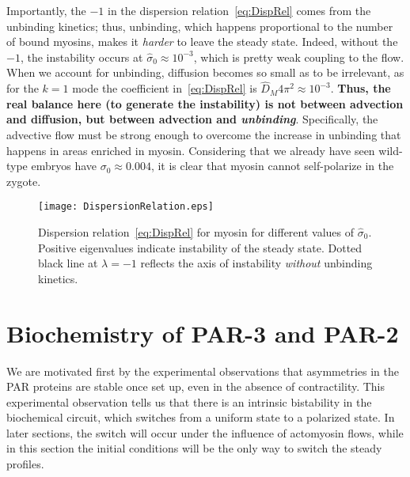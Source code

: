 \documentclass[11pt]{article}
\newcommand{\6}[1]{#1_{\text{6}}}
\newcommand{\3}[1]{#1_{\text{3}}}
\begin{document}
Importantly, the $-1$ in the dispersion relation\ \eqref{eq:DispRel} comes from the unbinding kinetics; thus, unbinding, which happens proportional to the number of bound myosins, makes it \emph{harder} to leave the steady state. Indeed, without the $-1$, the instability occurs at $\hat{\sigma}_0 \approx 10^{-3}$, which is pretty weak coupling to the flow. When we account for unbinding, diffusion becomes so small as to be irrelevant, as for the $k=1$ mode the coefficient in\ \eqref{eq:DispRel} is $\hat{D}_M 4 \pi^2 \approx 10^{-3}$. \textbf{Thus, the real balance here (to generate the instability) is not between advection and diffusion, but between advection and \emph{unbinding}}. Specifically, the advective flow must be strong enough to overcome the increase in unbinding that happens in areas enriched in myosin. Considering that we already have seen wild-type embryos have $\sigma_0 \approx 0.004$, it is clear that myosin cannot self-polarize in the zygote.

\begin{figure}
\centering
\texttt{[image: DispersionRelation.eps]}
\caption{\label{fig:DispRelMy}Dispersion relation\ \eqref{eq:DispRel} for myosin for different values of $\hat{\sigma}_0$. Positive eigenvalues indicate instability of the steady state. Dotted black line at $\lambda=-1$ reflects the axis of instability \emph{without} unbinding kinetics.}
\end{figure}

\section{Biochemistry of PAR-3 and PAR-2 \label{sec:Biochem}}
We are motivated first by the experimental observations that asymmetries in the PAR proteins are stable once set up, even in the absence of contractility. This experimental observation tells us that there is an intrinsic bistability in the biochemical circuit, which switches from a uniform state to a polarized state. In later sections, the switch will occur under the influence of actomyosin flows, while in this section the initial conditions will be the only way to switch the steady profiles.
\end{document}
